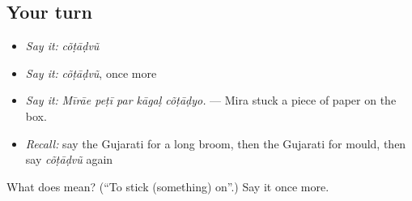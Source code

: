 \subsection*{Your turn}
\begin{itemize}
\raggedright
  \item \emph{Say it:} \emph{cõṭāḍvũ}
  \item \emph{Say it:} \emph{cõṭāḍvũ}, once more
  \item \emph{Say it:} \emph{Mīrāe peṭī par kāgaḷ cõṭāḍyo.} — Mira stuck a piece of paper on the box.
  \item \emph{Recall:} say the Gujarati for a long broom, then the Gujarati for mould, then say \emph{cõṭāḍvũ} again
\end{itemize}

\begin{tcolorbox}[breakable,colback=teal!4,colframe=teal!35!black,title={Before you move on}]
What does  mean? (\textquotedblleft{}To stick (something) on\textquotedblright{}.) Say it once more.
\end{tcolorbox}
